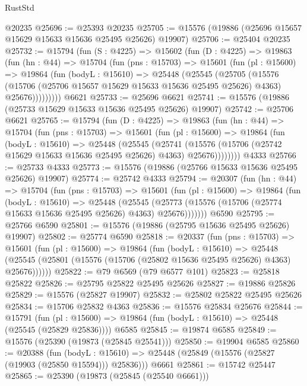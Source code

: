 \begin{lexlean}{RustStd}
\begin{coremodule}
    @20235
@25696 := @25393 @20235
@25705 := @15576 (@19886 (@25696 @15657 @15629 @15633 @15636 @25495 @25626) @19907)
@25706 := @25404 @20235
@25732 := @15794
    (fun (S : @4225) =>
    @15602
      (fun (D : @4225) =>
      @19863
        (fun (hn : @44) =>
        @15704
          (fun (pns : @15703) =>
          @15601
            (fun (pl : @15600) =>
            @19864
              (fun (bodyL : @15610) =>
              @25448
                (@25545
                  (@25705
                    (@15576
                      (@15706 (@25706 @15657 @15629 @15633 @15636 @25495 @25626) @4363)
                      @25676)))))))))
    @6621
@25733 := @25696 @6621
@25741 := @15576 (@19886 (@25733 @15629 @15633 @15636 @25495 @25626) @19907)
@25742 := @25706 @6621
@25765 := @15794
    (fun (D : @4225) =>
    @19863
      (fun (hn : @44) =>
      @15704
        (fun (pns : @15703) =>
        @15601
          (fun (pl : @15600) =>
          @19864
            (fun (bodyL : @15610) =>
            @25448
              (@25545
                (@25741
                  (@15576 (@15706 (@25742 @15629 @15633 @15636 @25495 @25626) @4363) @25676))))))))
    @4333
@25766 := @25733 @4333
@25773 := @15576 (@19886 (@25766 @15633 @15636 @25495 @25626) @19907)
@25774 := @25742 @4333
@25794 := @20307
    (fun (hn : @44) =>
    @15704
      (fun (pns : @15703) =>
      @15601
        (fun (pl : @15600) =>
        @19864
          (fun (bodyL : @15610) =>
          @25448
            (@25545
              (@25773 (@15576 (@15706 (@25774 @15633 @15636 @25495 @25626) @4363) @25676)))))))
    @6590
@25795 := @25766 @6590
@25801 := @15576 (@19886 (@25795 @15636 @25495 @25626) @19907)
@25802 := @25774 @6590
@25818 := @20337
    (fun (pns : @15703) =>
    @15601
      (fun (pl : @15600) =>
      @19864
        (fun (bodyL : @15610) =>
        @25448 (@25545 (@25801 (@15576 (@15706 (@25802 @15636 @25495 @25626) @4363) @25676))))))
@25822 := @79 @6569 (@79 @6577 @101)
@25823 := @25818 @25822
@25826 := @25795 @25822 @25495 @25626
@25827 := @19886 @25826
@25829 := @15576 (@25827 @19907)
@25832 := @25802 @25822 @25495 @25626
@25834 := @15706 @25832 @4363
@25836 := @15576 @25834 @25676
@25844 := @15791
    (fun (pl : @15600) => @19864 (fun (bodyL : @15610) => @25448 (@25545 (@25829 @25836))))
    @6585
@25845 := @19874 @6585
@25849 := @15576 (@25390 (@19873 (@25845 @25541)))
@25850 := @19904 @6585
@25860 := @20388
    (fun (bodyL : @15610) => @25448 (@25849 (@15576 (@25827 (@19903 (@25850 @15594))) @25836)))
    @6661
@25861 := @15742 @25447
@25865 := @25390 (@19873 (@25845 (@25540 @6661)))

\end{coremodule}
\end{lexlean}
